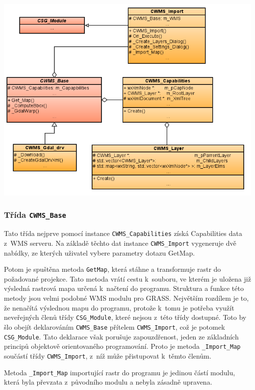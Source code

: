 \documentclass[a4paper,12pt]{article}
\begin{document}
\begin{center}
 \includegraphics[scale=0.6]{figures/SAGA_UML.png}
\end{center}



\subsubsection{Třída  {\tt \bfseries CWMS\_Base}}

Tato třída nejprve pomocí instance  {\tt CWMS\_Capabilities} získá
Capabilities data z~WMS serveru. Na základě těchto dat instance
 {\tt CWMS\_Import} vygeneruje dvě nabídky, ze kterých uživatel vybere
parametry dotazu GetMap.

Potom je spuštěna metoda {\tt GetMap}, která stáhne a transformuje rastr do
požadované projekce. Tato metoda vrátí cestu k~souboru, ve kterém je
uložena již výsledná rastrová mapa určená k~načtení do programu.
Struktura a funkce této metody jsou velmi podobné WMS modulu pro
GRASS. Největším rozdílem je to, že nenačítá výslednou mapu do
programu, protože k~tomu je potřeba využít neveřejných členů třídy
{\tt CSG\_Module}, které nejsou z~této třídy dostupné. Toto by šlo obejít
deklarováním {\tt CWMS\_Base} přítelem {\tt CWMS\_Import}, což je potomek
{\tt CSG\_Module}. Tato deklarace však porušuje zapouzdřenost, jeden ze
základních principů objektově orientovaného programování. Proto je
metoda {\tt \_Import\_Map} součástí třídy {\tt CWMS\_Import}, z~níž může
přistupovat k~těmto členům.
 
Metoda {\tt \_Import\_Map} importující rastr do programu je jedinou 
částí modulu, která byla převzata z~původního modulu a nebyla
zásadně upravena.
  
\end{document}
